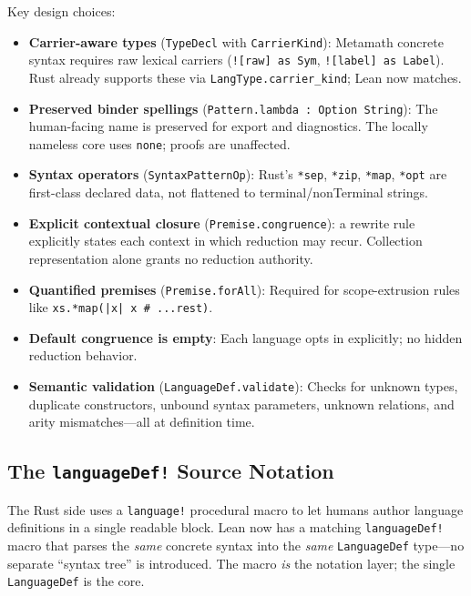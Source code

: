 \documentclass[11pt]{article}
\newcommand{\code}[1]{\texttt{#1}}
\begin{document}
Key design choices:
\begin{itemize}
\item \textbf{Carrier-aware types} (\code{TypeDecl} with \code{CarrierKind}):
  Metamath concrete syntax requires raw lexical carriers (\code{![raw] as Sym},
  \code{![label] as Label}). Rust already supports these via
  \code{LangType.carrier\_kind}; Lean now matches.
\item \textbf{Preserved binder spellings} (\code{Pattern.lambda : Option String}):
  The human-facing name is preserved for export and diagnostics.
  The locally nameless core uses \code{none}; proofs are unaffected.
\item \textbf{Syntax operators} (\code{SyntaxPatternOp}):
  Rust's \code{*sep}, \code{*zip}, \code{*map}, \code{*opt} are first-class
  declared data, not flattened to terminal/nonTerminal strings.
\item \textbf{Explicit contextual closure} (\code{Premise.congruence}):
  a rewrite rule explicitly states each context in which reduction may recur.
  Collection representation alone grants no reduction authority.
\item \textbf{Quantified premises} (\code{Premise.forAll}):
  Required for scope-extrusion rules like
  \code{xs.*map(|x| x \# ...rest)}.
\item \textbf{Default congruence is empty}:
  Each language opts in explicitly; no hidden reduction behavior.
\item \textbf{Semantic validation} (\code{LanguageDef.validate}):
  Checks for unknown types, duplicate constructors, unbound syntax parameters,
  unknown relations, and arity mismatches---all at definition time.
\end{itemize}

\subsection{The \code{languageDef!} Source Notation}

The Rust side uses a \code{language!} procedural macro to let humans author
language definitions in a single readable block.  Lean now has a matching
\code{languageDef!} macro that parses the \emph{same} concrete syntax into the
\emph{same} \code{LanguageDef} type---no separate ``syntax tree'' is introduced.
The macro \emph{is} the notation layer; the single \code{LanguageDef} is the
core.
\end{document}
